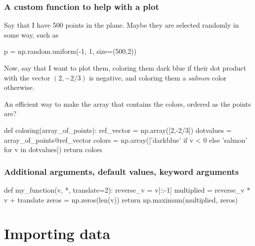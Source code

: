 \documentclass{beamer}
\newenvironment{codeblock}
    {\hfill\begin{beamerboxesrounded}[lower=codecol, width=0.8\textwidth]
    \medskip

    }
    { 
    \end{beamerboxesrounded}\hfill
    }
\theoremstyle{example}
\begin{document}
\begin{frame}[fragile]
\frametitle{A custom function to help with a plot}
Say that I have 500 points in the plane. Maybe they are selected randomly in some way, such as 

\begin{codeblock}

\begin{python}[numbers=none]
p = np.random.uniform(-1, 1, size=(500,2))
\end{python}

\end{codeblock}

\pause
Now, say that I want to plot them, coloring them dark blue if their dot product with the vector $(2,-2/3)$ is negative, and coloring them a \emph{salmon} color otherwise.

An efficient way to make the array that contains the colors, ordered as the points are?

\pause
\begin{codeblock}

\begin{python}
def coloring(array_of_points):
    ref_vector = np.array([2,-2/3])
    dotvalues = array_of_points@ref_vector
    colors = np.array(['darkblue' if v < 0 else 'salmon' for v in dotvalues])
    return colors
\end{python}

\end{codeblock}
\end{frame}

\begin{frame}[fragile]
\frametitle{Additional arguments, default values, keyword arguments}


\begin{codeblock}

\begin{python}
def my_function(v, *, translate=2):
    reverse_v = v[::-1]
    multiplied = reverse_v * v + translate
    zeros = np.zeros(len(v))
    return np.maximum(multiplied, zeros)
\end{python}

\end{codeblock}

\end{frame}

\section{Importing data}
\end{document}
